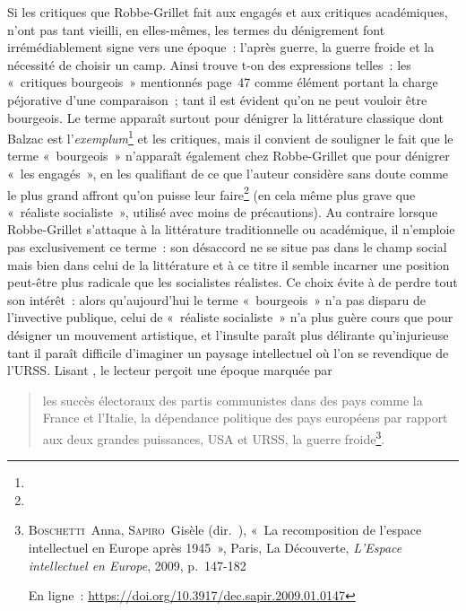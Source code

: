 \documentclass[12pt, a4paper]{article}
\begin{document}
Si les critiques que Robbe-Grillet fait aux engagés et aux critiques académiques, n'ont pas tant vieilli, en elles-mêmes, les termes du dénigrement font irrémédiablement signe vers une époque~: l'après guerre, la guerre froide et la nécessité de choisir un camp. Ainsi trouve t-on des expressions telles~: les «~critiques bourgeois~» mentionnés page~47 comme élément portant la charge péjorative d'une comparaison~; tant il est évident qu'on ne peut vouloir être bourgeois. Le terme apparaît surtout pour dénigrer la littérature classique dont Balzac est l'\textit{exemplum}\footnote{} et les critiques, mais il convient de souligner le fait que le terme «~bourgeois~» n'apparaît également chez Robbe-Grillet que pour dénigrer «~les engagés~», en les qualifiant de ce que l'auteur considère sans doute comme le plus grand affront qu'on puisse leur faire\footnote{} (en cela même plus grave que «~réaliste socialiste~», utilisé avec moins de précautions). Au contraire lorsque Robbe-Grillet s'attaque à la littérature traditionnelle ou académique, il n'emploie pas exclusivement ce terme~: son désaccord ne se situe pas dans le champ social mais bien dans celui de la littérature et à ce titre il semble incarner une position peut-être plus radicale que les socialistes réalistes. Ce choix évite à \punr{} de perdre tout son intérêt~: alors qu'aujourd'hui le terme «~bourgeois~» n'a pas disparu de l'invective publique, celui de «~réaliste socialiste~» n'a plus guère cours que pour désigner un mouvement artistique, et l'insulte paraît plus délirante qu'injurieuse tant il paraît difficile d'imaginer un paysage intellectuel où l'on se revendique de l'URSS. Lisant \punr, le lecteur perçoit une époque marquée par
\begin{quote}
    les succès électoraux des partis communistes dans des pays comme la France et l’Italie, la dépendance politique des pays européens par rapport aux deux grandes puissances, USA et URSS, la guerre froide\footnote{\textsc{Boschetti}~Anna, \textsc{Sapiro}~Gisèle (dir.~), «~La recomposition de l'espace intellectuel en Europe après 1945~», Paris, La Découverte, \textit{L'Espace intellectuel en Europe}, 2009, p.~147-182

En ligne~: \href{https://doi.org/10.3917/dec.sapir.2009.01.0147}{https://doi.org/10.3917/dec.sapir.2009.01.0147}}.
\end{quote}

\end{document}
